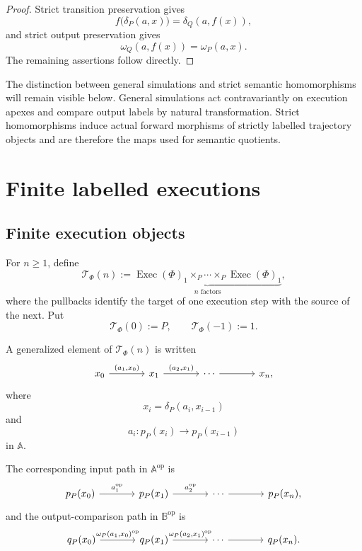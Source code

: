 \begin{proof}
Strict transition preservation gives
\[
    f\bigl(\delta_P(a,x)\bigr)
    =
    \delta_Q(a,f(x)),
\]
and strict output preservation gives
\[
    \omega_Q(a,f(x))
    =
    \omega_P(a,x).
\]
The remaining assertions follow directly.
\end{proof}

The distinction between general simulations and strict semantic
homomorphisms will remain visible below. General simulations act
contravariantly on execution apexes and compare output labels by natural
transformation. Strict homomorphisms induce actual forward morphisms of
strictly labelled trajectory objects and are therefore the maps used for
semantic quotients.

\section{Finite labelled executions}
\label{sec:finite-labelled-executions}

\subsection{Finite execution objects}
\label{subsec:finite-execution-objects}

For \(n\geq1\), define
\[
    \mathscr T_\Phi(n)
    :=
    \underbrace{
    \operatorname{Exec}(\Phi)_1
    \times_P
    \cdots
    \times_P
    \operatorname{Exec}(\Phi)_1
    }_{n\text{ factors}},
\]
where the pullbacks identify the target of one execution step with the source
of the next. Put
\[
    \mathscr T_\Phi(0):=P,
    \qquad
    \mathscr T_\Phi(-1):=1.
\]

A generalized element of \(\mathscr T_\Phi(n)\) is written
\[
\begin{tikzcd}[column sep=large]
    x_0
        \arrow[r, "{(a_1,x_0)}"]
    &
    x_1
        \arrow[r, "{(a_2,x_1)}"]
    &
    \cdots
        \arrow[r]
    &
    x_n,
\end{tikzcd}
\]
where
\[
    x_i=\delta_P(a_i,x_{i-1})
\]
and
\[
    a_i:p_P(x_i)\to p_P(x_{i-1})
\]
in \(\mathbb A\).

The corresponding input path in
\(\mathbb A^{\mathrm{op}}\) is
\[
\begin{tikzcd}[column sep=large]
    p_P(x_0)
        \arrow[r, "a_1^{\mathrm{op}}"]
    &
    p_P(x_1)
        \arrow[r, "a_2^{\mathrm{op}}"]
    &
    \cdots
        \arrow[r]
    &
    p_P(x_n),
\end{tikzcd}
\]
and the output-comparison path in
\(\mathbb B^{\mathrm{op}}\) is
\[
\begin{tikzcd}[column sep=large]
    q_P(x_0)
        \arrow[r, "{\omega_P(a_1,x_0)^{\mathrm{op}}}"]
    &
    q_P(x_1)
        \arrow[r, "{\omega_P(a_2,x_1)^{\mathrm{op}}}"]
    &
    \cdots
        \arrow[r]
    &
    q_P(x_n).
\end{tikzcd}
\]

